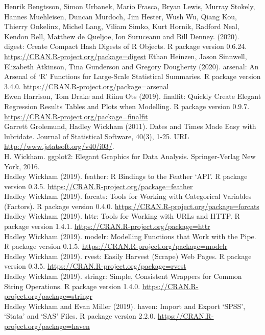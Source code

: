 \documentclass[
]{article}
\begin{document}
Henrik Bengtsson, Simon Urbanek, Mario Frasca, Bryan Lewis, Murray
Stokely, Hannes Muehleisen, Duncan Murdoch, Jim Hester, Wush Wu, Qiang
Kou, Thierry Onkelinx, Michel Lang, Viliam Simko, Kurt Hornik, Radford
Neal, Kendon Bell, Matthew de Queljoe, Ion Suruceanu and Bill Denney.
(2020). digest: Create Compact Hash Digests of R Objects. R package
version 0.6.24. \url{https://CRAN.R-project.org/package=digest} Ethan
Heinzen, Jason Sinnwell, Elizabeth Atkinson, Tina Gunderson and Gregory
Dougherty (2020). arsenal: An Arsenal of `R' Functions for Large-Scale
Statistical Summaries. R package version 3.4.0.
\url{https://CRAN.R-project.org/package=arsenal}\\
Ewen Harrison, Tom Drake and Riinu Ots (2019). finalfit: Quickly Create
Elegant Regression Results Tables and Plots when Modelling. R package
version 0.9.7. \url{https://CRAN.R-project.org/package=finalfit}\\
Garrett Grolemund, Hadley Wickham (2011). Dates and Times Made Easy with
lubridate. Journal of Statistical Software, 40(3), 1-25. URL
\url{http://www.jstatsoft.org/v40/i03/}.\\
H. Wickham. ggplot2: Elegant Graphics for Data Analysis. Springer-Verlag
New York, 2016.\\
Hadley Wickham (2019). feather: R Bindings to the Feather `API'. R
package version 0.3.5.
\url{https://CRAN.R-project.org/package=feather}\\
Hadley Wickham (2019). forcats: Tools for Working with Categorical
Variables (Factors). R package version 0.4.0.
\url{https://CRAN.R-project.org/package=forcats}\\
Hadley Wickham (2019). httr: Tools for Working with URLs and HTTP. R
package version 1.4.1. \url{https://CRAN.R-project.org/package=httr}\\
Hadley Wickham (2019). modelr: Modelling Functions that Work with the
Pipe. R package version 0.1.5.
\url{https://CRAN.R-project.org/package=modelr}\\
Hadley Wickham (2019). rvest: Easily Harvest (Scrape) Web Pages. R
package version 0.3.5. \url{https://CRAN.R-project.org/package=rvest}\\
Hadley Wickham (2019). stringr: Simple, Consistent Wrappers for Common
String Operations. R package version 1.4.0.
\url{https://CRAN.R-project.org/package=stringr}\\
Hadley Wickham and Evan Miller (2019). haven: Import and Export `SPSS',
`Stata' and `SAS' Files. R package version 2.2.0.
\url{https://CRAN.R-project.org/package=haven}\\
\end{document}
